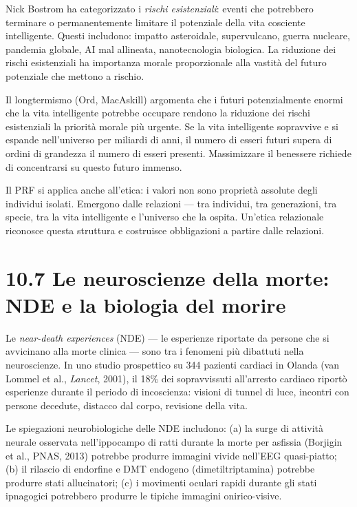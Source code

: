 \documentclass[11.5pt,a4paper,openany]{book}
\theoremstyle{remark}
\begin{document}
Nick Bostrom ha categorizzato i \textit{rischi esistenziali}: eventi che potrebbero terminare o permanentemente limitare il potenziale della vita cosciente intelligente. Questi includono: impatto asteroidale, supervulcano, guerra nucleare, pandemia globale, AI mal allineata, nanotecnologia biologica. La riduzione dei rischi esistenziali ha importanza morale proporzionale alla vastità del futuro potenziale che mettono a rischio.

Il longtermismo (Ord, MacAskill) argomenta che i futuri potenzialmente enormi che la vita intelligente potrebbe occupare rendono la riduzione dei rischi esistenziali la priorità morale più urgente. Se la vita intelligente sopravvive e si espande nell'universo per miliardi di anni, il numero di esseri futuri supera di ordini di grandezza il numero di esseri presenti. Massimizzare il benessere richiede di concentrarsi su questo futuro immenso.

Il PRF si applica anche all'etica: i valori non sono proprietà assolute degli individui isolati. Emergono dalle relazioni --- tra individui, tra generazioni, tra specie, tra la vita intelligente e l'universo che la ospita. Un'etica relazionale riconosce questa struttura e costruisce obbligazioni a partire dalle relazioni.

\section{10.7 Le neuroscienze della morte: NDE e la biologia del morire}

Le \textit{near-death experiences} (NDE) --- le esperienze riportate da persone che si avvicinano alla morte clinica --- sono tra i fenomeni più dibattuti nella neuroscienze. In uno studio prospettico su 344 pazienti cardiaci in Olanda (van Lommel et al., \textit{Lancet}, 2001), il 18\% dei sopravvissuti all'arresto cardiaco riportò esperienze durante il periodo di incoscienza: visioni di tunnel di luce, incontri con persone decedute, distacco dal corpo, revisione della vita.

Le spiegazioni neurobiologiche delle NDE includono: (a) la surge di attività neurale osservata nell'ippocampo di ratti durante la morte per asfissia (Borjigin et al., PNAS, 2013) potrebbe produrre immagini vivide nell'EEG quasi-piatto; (b) il rilascio di endorfine e DMT endogeno (dimetiltriptamina) potrebbe produrre stati allucinatori; (c) i movimenti oculari rapidi durante gli stati ipnagogici potrebbero produrre le tipiche immagini onirico-visive.
\end{document}

